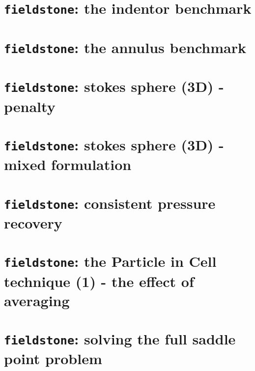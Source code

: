 \documentclass[a4paper]{article}
\begin{document}
\newpage
\section{{\tt fieldstone}: the indentor benchmark}


\newpage
\section{{\tt fieldstone}: the annulus benchmark}



\newpage
\section{{\tt fieldstone}: stokes sphere (3D) - penalty\label{f5}}


\newpage
\section{{\tt fieldstone}: stokes sphere (3D) - mixed formulation\label{f5}}


\newpage
\section{{\tt fieldstone}: consistent pressure recovery }


\newpage
\section{{\tt fieldstone}: the Particle in Cell technique (1) - the effect of averaging}


\newpage
\section{{\tt fieldstone}: solving the full saddle point problem \label{sec_fspq1p0}}

\end{document}
